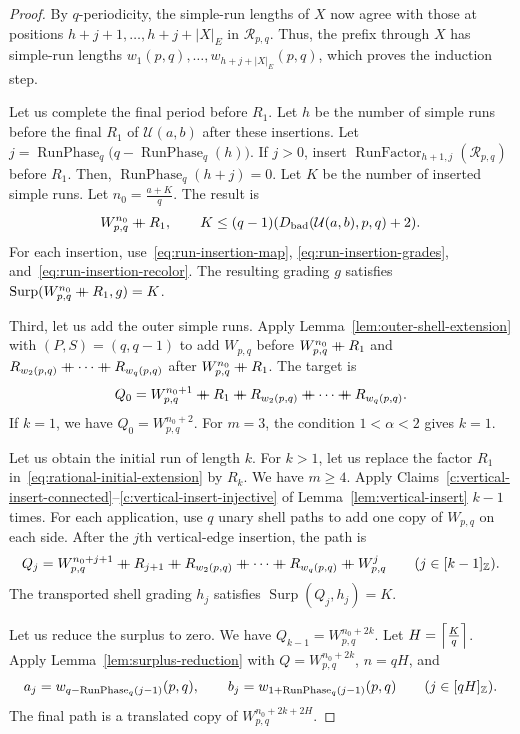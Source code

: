 \begin{proof}
By $q$-periodicity, the simple-run lengths of $X$ now agree with those at positions $h+j+1,\ldots,h+j+|X|_E$ in $\mathcal R_{p,q}$.
Thus, the prefix through $X$ has simple-run lengths $w_1(p,q),\ldots,w_{h+j+|X|_E}(p,q)$, which proves the induction step.

Let us complete the final period before $R_1$.
Let $h$ be the number of simple runs before the final $R_1$ of $\mathcal U(a,b)$ after these insertions.
Let $j=\operatorname{RunPhase}_q\bigl(q-\operatorname{RunPhase}_q(h)\bigr)$.
If $j>0$, insert $\operatorname{RunFactor}_{h+1,j}(\mathcal R_{p,q})$ before $R_1$.
Then, $\operatorname{RunPhase}_q(h+j)=0$.
Let $K$ be the number of inserted simple runs. Let $n_0=\frac{a+K}{q}$.
The result is
\[
 W_{p,q}^{n_0}\mathbin{+\mkern-10mu+} R_1,\qquad
 K\le(q-1)(D_{\mathrm{bad}}(\mathcal U(a,b),p,q)+2).
\]
For each insertion, use~\eqref{eq:run-insertion-map},
\eqref{eq:run-insertion-grades}, and~\eqref{eq:run-insertion-recolor}.
The resulting grading $g$ satisfies $\operatorname{Surp}(W_{p,q}^{n_0}\mathbin{+\mkern-10mu+} R_1,g)=K$.

Third, let us add the outer simple runs.
Apply Lemma~\ref{lem:outer-shell-extension} with $(P,S)=(q,q-1)$
to add $W_{p,q}$ before $W_{p,q}^{n_0}\mathbin{+\mkern-10mu+} R_1$ and $R_{w_2(p,q)}\mathbin{+\mkern-10mu+} \cdots\mathbin{+\mkern-10mu+} R_{w_q(p,q)}$ after $W_{p,q}^{n_0}\mathbin{+\mkern-10mu+} R_1$.
The target is
\begin{equation}\label{eq:rational-initial-extension}
 Q_0=W_{p,q}^{n_0+1}\ccn R_1\ccn R_{w_2(p,q)}\ccn \cdots\ccn R_{w_q(p,q)}.
\end{equation}
If $k=1$, we have $Q_0=W_{p,q}^{n_0+2}$. For $m=3$, the condition $1<\alpha<2$ gives $k=1$.

Let us obtain the initial run of length $k$.
For $k>1$, let us replace the factor $R_1$ in~\eqref{eq:rational-initial-extension} by $R_k$.
We have $m\ge4$. Apply Claims~\ref{c:vertical-insert-connected}--\ref{c:vertical-insert-injective} of Lemma~\ref{lem:vertical-insert} $k-1$ times.
For each application, use $q$ unary shell paths to add one copy of $W_{p,q}$ on each side.
After the $j$th vertical-edge insertion, the path is
\[
 Q_j=W_{p,q}^{n_0+j+1}\ccn R_{j+1}\ccn R_{w_2(p,q)}\ccn \cdots\ccn R_{w_q(p,q)}\ccn W_{p,q}^j
 \qquad(j\in[k-1]_{\Z}).
\]
The transported shell grading $h_j$ satisfies $\operatorname{Surp}(Q_j,h_j)=K$.

Let us reduce the surplus to zero.
We have $Q_{k-1}=W_{p,q}^{n_0+2k}$.
Let $H=\left\lceil\frac Kq\right\rceil$.
Apply Lemma~\ref{lem:surplus-reduction} with $Q=W_{p,q}^{n_0+2k}$, $n=qH$, and
\[
 a_j=w_{q-\operatorname{RunPhase}_q(j-1)}(p,q),\qquad
 b_j=w_{1+\operatorname{RunPhase}_q(j-1)}(p,q)
 \qquad(j\in[qH]_{\mathbb Z}).
\]
The final path is a translated copy of $W_{p,q}^{n_0+2k+2H}$.


\end{proof}
